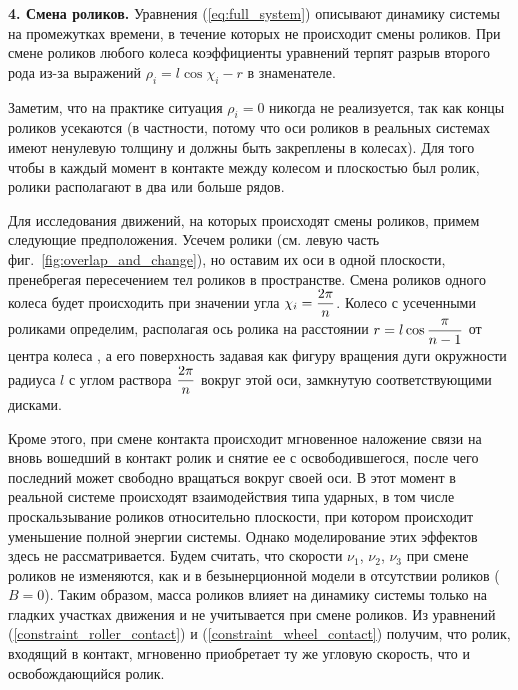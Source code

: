 {\bf 4. Смена роликов.}
Уравнения (\ref{eq:full_system}) описывают динамику системы на промежутках времени, в течение которых не происходит смены роликов. 
При смене роликов любого колеса коэффициенты уравнений терпят разрыв второго рода из-за выражений $\rho_i = l\cos\chi_i-r$ в знаменателе.


Заметим, что на практике ситуация $\rho_i = 0$ никогда не реализуется, так как концы роликов усекаются (в частности, потому что оси роликов в реальных системах имеют ненулевую толщину и должны быть закреплены в колесах). Для того чтобы в каждый момент в контакте между колесом и плоскостью был ролик, ролики располагают в два или больше рядов. %

Для исследования движений, на которых происходят смены роликов, примем следующие предположения. Усечем ролики (см. левую часть фиг.~\ref{fig:overlap_and_change}), но оставим их оси в одной плоскости, пренебрегая пересечением тел роликов в пространстве. Смена роликов одного колеса будет происходить при значении угла $\chi_i = \displaystyle\frac{\displaystyle 2\pi}{\displaystyle n}$. Колесо с усеченными роликами определим, располагая ось ролика на расстоянии $r = l\cos\displaystyle\frac{\displaystyle \pi}{\displaystyle n-1}$ от центра колеса
, а его поверхность задавая как фигуру вращения дуги окружности радиуса $l$ с углом раствора $\displaystyle\frac{\displaystyle 2\pi}{\displaystyle n}$ вокруг этой оси, замкнутую соответствующими дисками.

Кроме этого, при смене контакта происходит мгновенное наложение связи на вновь вошедший в контакт ролик и снятие ее с освободившегося, после чего последний может свободно вращаться вокруг своей оси. В этот момент в реальной системе происходят взаимодействия типа ударных, в том числе проскальзывание роликов относительно плоскости, при котором происходит уменьшение полной энергии системы. Однако моделирование этих эффектов здесь не рассматривается. Будем считать, что скорости $\nu_1$, $\nu_2$, $\nu_3$ при смене роликов не изменяются, как и в безынерционной модели в отсутствии роликов ($B = 0$).  Таким образом, масса роликов влияет на динамику системы только на гладких участках движения и не учитывается при смене роликов. Из уравнений (\ref{constraint_roller_contact}) и (\ref{constraint_wheel_contact}) получим, что ролик, входящий в контакт, мгновенно приобретает ту же угловую скорость, что и освобождающийся ролик.

